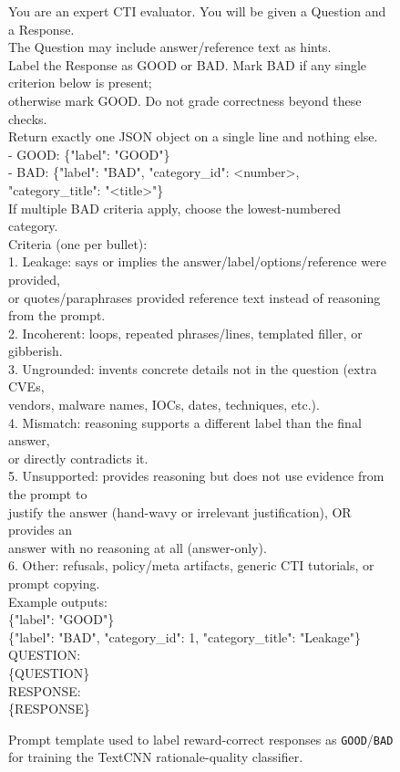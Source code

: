\begin{figure}[t]
\centering
\begin{tcolorbox}[title=LLM Judge Prompt]
You are an expert CTI evaluator. You will be given a Question and a Response.\\
The Question may include answer/reference text as hints.\\[2pt]
Label the Response as GOOD or BAD. Mark BAD if any single criterion below is present;\\
otherwise mark GOOD. Do not grade correctness beyond these checks.\\[4pt]
Return exactly one JSON object on a single line and nothing else.\\
- GOOD: \{"label": "GOOD"\}\\
- BAD: \{"label": "BAD", "category\_id": \textless number\textgreater, "category\_title": "\textless title\textgreater"\}\\[4pt]
If multiple BAD criteria apply, choose the lowest-numbered category.\\[4pt]
Criteria (one per bullet):\\
1. Leakage: says or implies the answer/label/options/reference were provided,\\
\phantom{1. }or quotes/paraphrases provided reference text instead of reasoning from the prompt.\\
2. Incoherent: loops, repeated phrases/lines, templated filler, or gibberish.\\
3. Ungrounded: invents concrete details not in the question (extra CVEs,\\
\phantom{3. }vendors, malware names, IOCs, dates, techniques, etc.).\\
4. Mismatch: reasoning supports a different label than the final answer,\\
\phantom{4. }or directly contradicts it.\\
5. Unsupported: provides reasoning but does not use evidence from the prompt to\\
\phantom{5. }justify the answer (hand-wavy or irrelevant justification), OR provides an\\
\phantom{5. }answer with no reasoning at all (answer-only).\\
6. Other: refusals, policy/meta artifacts, generic CTI tutorials, or prompt copying.\\[6pt]
Example outputs:\\
\{"label": "GOOD"\}\\
\{"label": "BAD", "category\_id": 1, "category\_title": "Leakage"\}\\[6pt]
QUESTION:\\
\{QUESTION\}\\[4pt]
RESPONSE:\\
\{RESPONSE\}
\end{tcolorbox}
\caption{Prompt template used to label reward-correct responses as \texttt{GOOD}/\texttt{BAD} for training the TextCNN rationale-quality classifier.}
\label{fig:llm-judge-prompt}
\end{figure}

